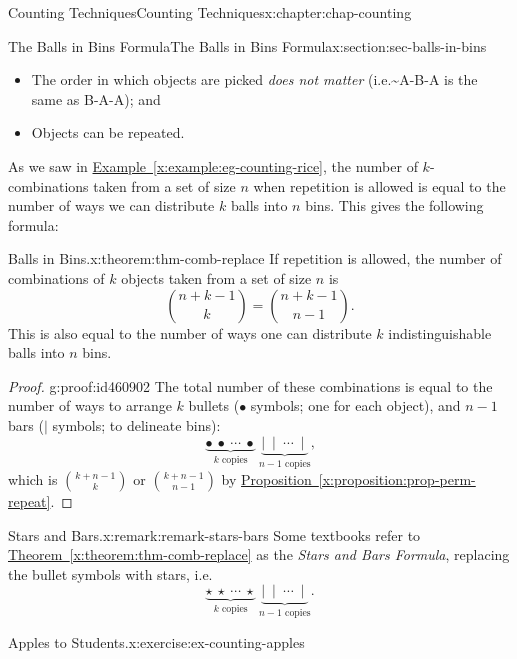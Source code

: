 \documentclass[oneside,10pt,]{book}
\newcommand{\xreffont}{\relax}
\numberwithin{equation}{section}
\begin{document}
\begin{chapterptx}{Counting Techniques}{}{Counting Techniques}{}{}{x:chapter:chap-counting}
\begin{sectionptx}{The Balls in Bins Formula}{}{The Balls in Bins Formula}{}{}{x:section:sec-balls-in-bins}
\begin{itemize}[label=\textbullet]
\item{}The order in which objects are picked \emph{does not matter} (i.e.\textasciitilde{}A-B-A is the same as B-A-A); and%
\item{}Objects can be repeated.%
\end{itemize}
As we saw in \hyperref[x:example:eg-counting-rice]{Example~{\xreffont\ref{x:example:eg-counting-rice}}}, the number of \(k\)-combinations taken from a set of size \(n\) when repetition is allowed is equal to the number of ways we can distribute \(k\) balls into \(n\) bins. This gives the following formula:%
\begin{theorem}{Balls in Bins.}{}{x:theorem:thm-comb-replace}%
If repetition is allowed, the number of combinations of \(k\) objects taken from a set of size \(n\) is%
\begin{equation*}
\binom{n+k-1}{k} = \binom{n+k-1}{n-1}\text{.}
\end{equation*}
This is also equal to the number of ways one can distribute \(k\) indistinguishable balls into \(n\) bins.%
\end{theorem}
\begin{proof}{}{g:proof:id460902}
The total number of these combinations is equal to the number of ways to arrange \(k\) bullets (\(\bullet\) symbols; one for each object), and \(n-1\) bars (\(\mid\) symbols; to delineate bins):%
\begin{equation*}
\underbrace{\bullet \ \bullet \ \cdots \ \bullet}_{k \text{ copies}}\ \underbrace{\mid \ \mid \ \cdots \ \mid}_{n-1 \text{ copies}}\text{,}
\end{equation*}
which is \(\displaystyle\binom{k+n-1}{k}\) or \(\binom{k+n-1}{n-1}\) by \hyperref[x:proposition:prop-perm-repeat]{Proposition~{\xreffont\ref{x:proposition:prop-perm-repeat}}}.%
\end{proof}
\begin{remark}{Stars and Bars.}{x:remark:remark-stars-bars}%
Some textbooks refer to \hyperref[x:theorem:thm-comb-replace]{Theorem~{\xreffont\ref{x:theorem:thm-comb-replace}}} as the \emph{Stars and Bars Formula}, replacing the bullet symbols with stars, i.e.\@%
\begin{equation*}
\underbrace{\star \ \star \ \cdots \ \star}_{k \text{ copies}}\ \underbrace{\mid \ \mid \ \cdots \ \mid}_{n-1 \text{ copies}}\text{.}
\end{equation*}
%
\end{remark}
\begin{inlineexercise}{Apples to Students.}{x:exercise:ex-counting-apples}%

\end{inlineexercise}
\end{sectionptx}
\end{chapterptx}
\end{document}
